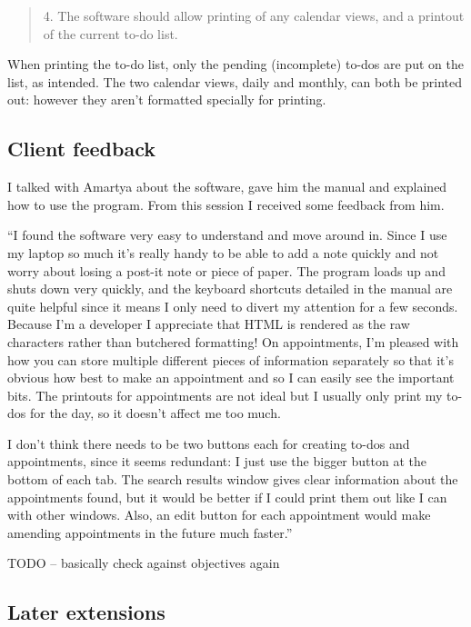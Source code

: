\begin{quotation}
4. The software should allow printing of any calendar views, and a printout of
the current to-do list.
\end{quotation}

When printing the to-do list, only the pending (incomplete) to-dos are put on
the list, as intended. The two calendar views, daily and monthly, can both be
printed out: however they aren't formatted specially for printing.


\subsection{Client feedback}

I talked with Amartya about the software, gave him the manual and explained how
to use the program. From this session I received some feedback from him.

``I found the software very easy to understand and move around in. Since I use
my laptop so much it's really handy to be able to add a note quickly and not
worry about losing a post-it note or piece of paper. The program loads up and
shuts down very quickly, and the keyboard shortcuts detailed in the manual are
quite helpful since it means I only need to divert my attention for a few
seconds. Because I'm a developer I appreciate that HTML is rendered as the raw
characters rather than butchered formatting! On appointments, I'm pleased with
how you can store multiple different pieces of information separately so that
it's obvious how best to make an appointment and so I can easily see the
important bits. The printouts for appointments are not ideal but I usually only
print my to-dos for the day, so it doesn't affect me too much.

I don't think there needs to be two buttons each for creating to-dos and
appointments, since it seems redundant: I just use the bigger button at the
bottom of each tab. The search results window gives clear information
about the appointments found, but it would be better if I could print them out
like I can with other windows. Also, an edit button for each appointment would
make amending appointments in the future much faster.''

TODO -- basically check against objectives again


\subsection{Later extensions}


